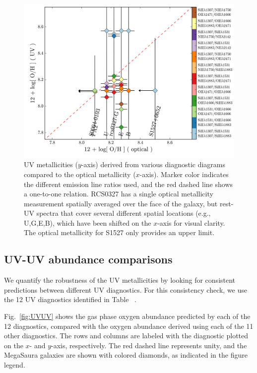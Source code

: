 \documentclass[preprint2]{aastex62}
\newcommand{\mage}{{\sc Meg}a{\sc S}a{\sc ura}\xspace}
\newcommand{\XXX}{{\bf \color{red}{XXX} }}
\begin{document}
\begin{figure}
  \begin{center}
    \includegraphics[width=\linewidth]{figs/f7.png}
    \caption{UV metallicities ($y$-axis) derived from various diagnostic diagrams compared to the optical metallicity ($x$-axis). Marker color indicates the different emission line ratios used, and the red dashed line shows a one-to-one relation. RCS0327 has a single optical metallicity measurement spatially averaged over the face of the galaxy, but rest-UV spectra that cover several different spatial locations (e.g., U,G,E,B), which have been shifted on the $x$-axis for visual clarity. The optical metallicity for S1527 only provides an upper limit.}
    \label{fig:UVZ}
  \end{center}
\end{figure}

\subsection{UV-UV abundance comparisons}\label{sec:ZZ:UV}

We quantify the robustness of the UV metallicities by looking for consistent predictions between different UV diagnostics. For this consistency check, we use the 12 UV diagnostics identified in Table~\XXX.

Fig.~\ref{fig:UVUV} shows the gas phase oxygen abundance predicted by each of the 12 diagnostics, compared with the oxygen abundance derived using each of the 11 other diagnostics. The rows and columns are labeled with the diagnostic plotted on the $x$- and $y$-axis, respectively. The red dashed line represents unity, and the \mage galaxies are shown with colored diamonds, as indicated in the figure legend.
\end{document}
